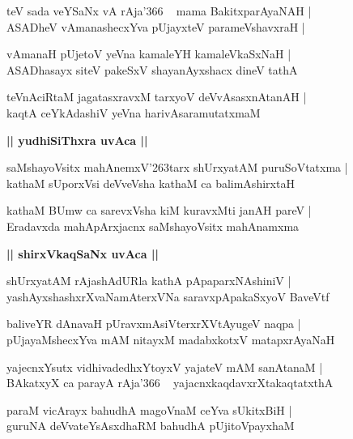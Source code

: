 \documentclass[twoside,12pt,openright]{book}
\def\S{\char'263}
\newcounter{shloka}[chapter]
\def\uvaca#1{\centerline{{\large\textbf{#1}}}}
\begin{document}
\begin{shloka}%
teV sada veYSaNx vA rAja\char'366 ~ mama BakitxparAyaNAH |\\
ASADheV vAmanashecxYva pUjayxteV parameVshavxraH |
\end{shloka}

\begin{shloka}%
vAmanaH pUjetoV yeVna kamaleYH kamaleVkaSxNaH |\\
ASADhasayx siteV pakeSxV shayanAyxshacx dineV tathA
\end{shloka}

\begin{shloka}%
teVnAciRtaM jagatasxravxM tarxyoV deVvAsasxnAtanAH |\\
kaqtA ceYkAdashiV yeVna harivAsaramutatxmaM 
\end{shloka}

\uvaca{|| yudhiSiThxra uvAca ||}

\begin{shloka}%
saMshayoVsitx mahAnemxV\S tarx shUrxyatAM puruSoVtatxma |\\
kathaM sUporxVsi deVveVsha kathaM ca balimAshirxtaH 
\end{shloka}

\begin{shloka}%
kathaM BUmw ca sarevxVsha kiM kuravxMti janAH pareV |\\
Eradavxda mahApArxjacnx saMshayoVsitx mahAnamxma
\end{shloka}

\uvaca{|| shirxVkaqSaNx uvAca ||}

\begin{shloka}%
shUrxyatAM rAjashAdURla kathA pApaparxNAshiniV |\\
yashAyxshashxrXvaNamAterxVNa saravxpApakaSxyoV BaveVtf
\end{shloka}

\begin{shloka}%
baliveYR dAnavaH pUravxmAsiVterxrXVtAyugeV naqpa |\\
pUjayaMshecxYva mAM nitayxM madabxkotxV matapxrAyaNaH
\end{shloka}

\begin{shloka}%
yajecnxYsutx vidhivadedhxYtoyxV yajateV mAM sanAtanaM |\\
BAkatxyX ca parayA rAja\char'366 ~ yajacnxkaqdavxrXtakaqtatxthA 
\end{shloka}

\begin{shloka}%
paraM vicArayx bahudhA magoVnaM ceYva sUkitxBiH |\\
guruNA deVvateYsAsxdhaRM bahudhA pUjitoVpayxhaM 
\end{shloka}
\end{document}
